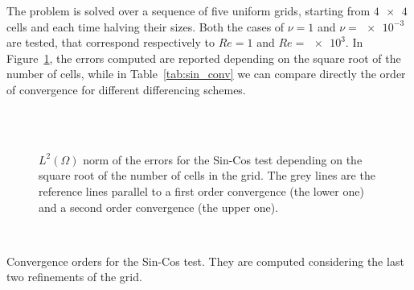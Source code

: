 The problem is solved over a sequence of five uniform grids, starting from 
$\num{4x4}$ cells and each time halving their sizes. Both the cases of $\nu=1$ 
and $\nu=\num{e-3}$ are tested, that correspond respectively to $Re=1$ and 
$Re=\num{e3}$. In Figure~\ref{fig:sin_err}, the errors computed are reported 
depending on the square root of the number of cells, while in 
Table~\ref{tab:sin_conv} we can compare directly the 
order of convergence for different differencing schemes.
\begin{figure}
	\centering
	\subfloat[Upwind, $Re = 1$]{
		}
	\subfloat[Upwind, $Re = \num{e3}$]{
		}\\
	\subfloat[Min-Mod, $Re = 1$]{
		}
	\subfloat[Min-Mod, $Re = \num{e3}$]{
		}\\
	\subfloat[Van Leer, $Re = 1$]{
		}
	\subfloat[Van Leer, $Re = \num{e3}$]{
		\label{fig:sin_err_vl_hre}}
	\caption[$L^2(\Omega)$ norm of the errors for the Sin-Cos 
	test]{$L^2(\Omega)$ norm of the errors 
	for the Sin-Cos 
	test depending on the square root of the number of cells in the grid. 
	The grey lines are the reference lines parallel to a first order convergence (the lower one) and a
	second order convergence (the upper one).}
	\label{fig:sin_err}
\end{figure}

\begin{table}
	\centering
	\\
	\caption[Convergence orders for the Sin-Cos test]{Convergence orders for 
	the Sin-Cos test. They are computed considering the last two refinements of 
	the grid.}
	\label{tab:sin_conv}
\end{table}

